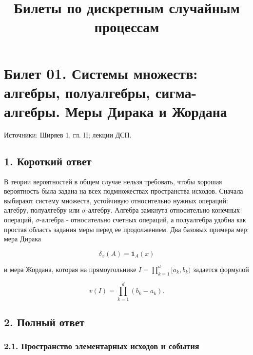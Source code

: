 \documentclass[
  11pt,
  a4paper,
]{article}
\title{Билеты по дискретным случайным процессам}
\author{}
\date{}
\begin{document}
\maketitle

\section{Билет 01. Системы множеств: алгебры, полуалгебры,
сигма-алгебры. Меры Дирака и
Жордана}\label{ux431ux438ux43bux435ux442-01.-ux441ux438ux441ux442ux435ux43cux44b-ux43cux43dux43eux436ux435ux441ux442ux432-ux430ux43bux433ux435ux431ux440ux44b-ux43fux43eux43bux443ux430ux43bux433ux435ux431ux440ux44b-ux441ux438ux433ux43cux430-ux430ux43bux433ux435ux431ux440ux44b.-ux43cux435ux440ux44b-ux434ux438ux440ux430ux43aux430-ux438-ux436ux43eux440ux434ux430ux43dux430}

Источники: Ширяев 1, гл. II; лекции ДСП.

\subsection{1. Короткий
ответ}\label{ux43aux43eux440ux43eux442ux43aux438ux439-ux43eux442ux432ux435ux442}

В теории вероятностей в общем случае нельзя требовать, чтобы хорошая
вероятность была задана на всех подмножествах пространства исходов.
Сначала выбирают систему множеств, устойчивую относительно нужных
операций: алгебру, полуалгебру или \(\sigma\)-алгебру. Алгебра замкнута
относительно конечных операций, \(\sigma\)-алгебра - относительно
счетных операций, а полуалгебра удобна как простая область задания меры
перед ее продолжением. Два базовых примера мер: мера Дирака

\[
\delta_x(A)=\mathbf 1_A(x)
\]

и мера Жордана, которая на прямоугольнике \(I=\prod_{k=1}^d[a_k,b_k)\)
задается формулой

\[
v(I)=\prod_{k=1}^d(b_k-a_k).
\]

\subsection{2. Полный
ответ}\label{ux43fux43eux43bux43dux44bux439-ux43eux442ux432ux435ux442}

\subsubsection{2.1. Пространство элементарных исходов и
события}\label{ux43fux440ux43eux441ux442ux440ux430ux43dux441ux442ux432ux43e-ux44dux43bux435ux43cux435ux43dux442ux430ux440ux43dux44bux445-ux438ux441ux445ux43eux434ux43eux432-ux438-ux441ux43eux431ux44bux442ux438ux44f}
\end{document}
